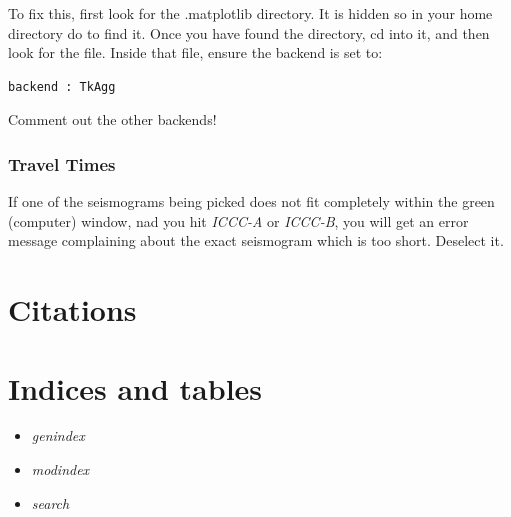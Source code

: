 \documentclass[letterpaper,10pt,english]{sphinxmanual}
\begin{document}
To fix this, first look for the .matplotlib directory. It is hidden so in your home directory do  to find it.
Once you have found the  directory, cd into it, and then look for the  file.
Inside that file, ensure the backend is set to:

\begin{Verbatim}[commandchars=\\\{\}]
backend : TkAgg
\end{Verbatim}

Comment out the other backends!


\subsection{Travel Times}
\label{docfiles/PickingTravelTimes:travel-times}
If one of the seismograms being picked does not fit completely within the green (computer) window, nad you hit \emph{ICCC-A} or \emph{ICCC-B}, you will get an error message complaining about the exact seismogram which is too short. Deselect it.


\chapter{Citations}
\label{docfiles/citations:citations}\label{docfiles/citations::doc}

\chapter{Indices and tables}
\label{index:indices-and-tables}\begin{itemize}
\item {} 
\emph{genindex}

\item {} 
\emph{modindex}

\item {} 
\emph{search}

\end{itemize}
\end{document}
